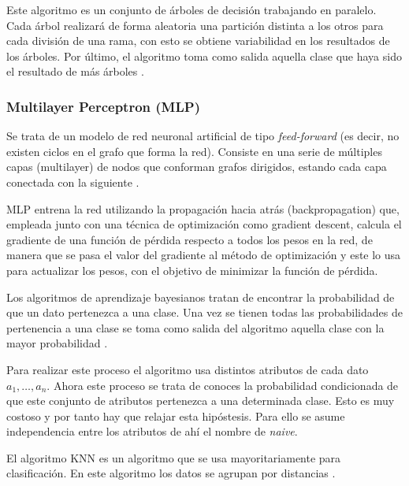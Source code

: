 
Este algoritmo es un conjunto de árboles de decisión trabajando en paralelo. Cada árbol realizará de forma aleatoria una partición distinta a los otros para cada división de una rama, con esto se obtiene variabilidad en los resultados de los árboles. Por último, el algoritmo toma como salida aquella clase que haya sido el resultado de más árboles \cite{breiman2001random}\cite{hatwell2020chirps}.

\subsubsection{Multilayer Perceptron (MLP)}

Se trata de un modelo de red neuronal artificial de tipo \textit{feed-forward} (es decir, no existen ciclos en el grafo que forma la red). Consiste en una serie de múltiples capas (multilayer) de nodos que conforman grafos dirigidos, estando cada capa conectada con la siguiente \cite{murtagh1991multilayer}. 

MLP entrena la red utilizando la propagación hacia atrás (backpropagation) que, empleada junto con una técnica de optimización como gradient descent, calcula el gradiente de una función de pérdida respecto a todos los pesos en la red, de manera que se pasa el valor del gradiente al método de optimización y este lo usa para actualizar los pesos, con el objetivo de minimizar la función de pérdida.


Los algoritmos de aprendizaje bayesianos tratan de encontrar la probabilidad de que un dato pertenezca a una clase. Una vez se tienen todas las probabilidades de pertenencia a una clase se toma como salida del algoritmo aquella clase con la mayor probabilidad \cite{murphy2006naive}.

Para realizar este proceso el algoritmo usa distintos atributos de cada dato $a_1, \dots, a_n$. Ahora este proceso se trata de conoces la probabilidad condicionada de que este conjunto de atributos pertenezca a una determinada clase. Esto es muy costoso y por tanto hay que relajar esta hipóstesis. Para ello se asume independencia entre los atributos de ahí el nombre de \textit{naive}.


El algoritmo KNN es un algoritmo que se usa mayoritariamente para clasificación. En este algoritmo los datos se agrupan por distancias \cite{taunk2019brief}. 

